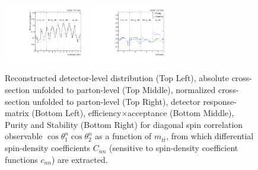 \begin{figure}[htb]
\begin{center}
 \includegraphics[width=0.32\textwidth]{fig_fullRun2UL/unfolding/combined/TotEff_c_nn_mttbar.pdf}
 \includegraphics[width=0.32\textwidth]{fig_fullRun2UL/unfolding/combined/PurStab_c_nn_mttbar.pdf} \\
\caption{Reconstructed detector-level distribution (Top Left), absolute cross-section unfolded to parton-level (Top Middle), normalized cross-section unfolded to parton-level (Top Right), detector response-matrix (Bottom Left), efficiency$\times$acceptance (Bottom Middle), Purity and Stability (Bottom Right) for diagonal spin correlation observable $\cos\theta_{1}^{n}\cos\theta_{2}^{n}$ as a function of $m_{t\bar{t}}$, from which differential spin-density coefficients $C_{nn}$ (sensitive to spin-density coefficient functions $c_{n n}$) are extracted.}
\label{fig:c_nn_mttbar}
\end{center}
\end{figure}
\clearpage
